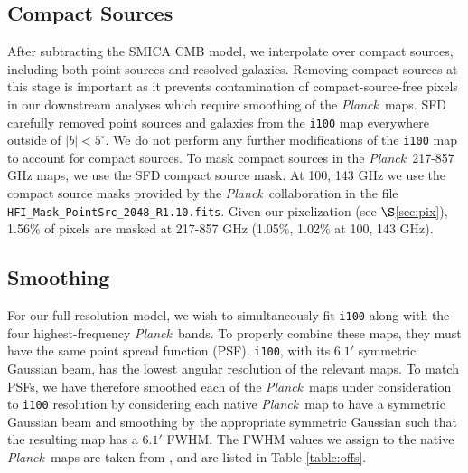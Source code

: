 \documentclass{emulateapj}
\newcommand{\PLANCK}{{\it Planck}}
\begin{document}
\subsection{Compact Sources}
\label{sec:ptsrc}
After subtracting the SMICA CMB model, we interpolate over compact sources, 
including both point sources and resolved galaxies. Removing compact sources at
this stage is important as it prevents contamination of compact-source-free 
pixels in our downstream analyses which require smoothing of the \PLANCK~maps. 
SFD carefully removed point sources and galaxies from the \verb|i100| map 
everywhere outside of $|b|$$<$$5^{\circ}$. We do not perform any further 
modifications of the \verb|i100| map to account for compact sources. To mask 
compact sources in the \PLANCK~217-857 GHz maps, we use the SFD compact source 
mask. At 100, 143 GHz we use the compact source masks provided by the 
\PLANCK~collaboration in the file \verb|HFI_Mask_PointSrc_2048_R1.10.fits|. 
Given our pixelization (see $\S$\ref{sec:pix}), 1.56\% of pixels are masked 
at 217-857 GHz (1.05\%, 1.02\% at 100, 143 GHz).

\subsection{Smoothing}
\label{sec:smth}
For our full-resolution model, we wish to simultaneously fit \verb|i100| along 
with the four highest-frequency \PLANCK~bands. To properly combine these maps, 
they must have the same point spread function (PSF). \verb|i100|, with its 
$6.1'$ symmetric Gaussian beam, has the lowest angular resolution of the 
relevant maps. To match PSFs, we have therefore smoothed each of the 
\PLANCK~maps under consideration to \verb|i100| resolution by considering each 
native \PLANCK~map to have a symmetric Gaussian beam and smoothing by the 
appropriate symmetric Gaussian such that the resulting map has a  $6.1'$ FWHM. 
The FWHM values we assign to the native \PLANCK~maps are taken from 
\cite{planckbeam}, and are listed in Table \ref{table:offs}.
\end{document}
